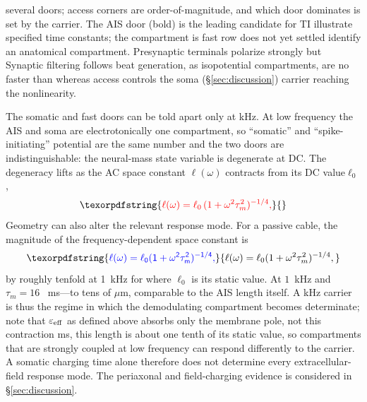 \documentclass[11pt,a4paper]{article}
\providecommand{\DIFaddtex}[1]{{\protect\color{blue} \sf #1}} %
\providecommand{\DIFdeltex}[1]{{\protect\color{red} \scriptsize #1}} %
\providecommand{\DIFaddbegin}{} %
\providecommand{\DIFaddend}{} %
\providecommand{\DIFdelbegin}{} %
\providecommand{\DIFdelend}{} %
\providecommand{\DIFaddFL}[1]{\DIFadd{#1}} %
\providecommand{\DIFdelFL}[1]{\DIFdel{#1}} %
\providecommand{\DIFaddbeginFL}{} %
\providecommand{\DIFaddendFL}{} %
\providecommand{\DIFdelbeginFL}{} %
\providecommand{\DIFdelendFL}{} %
\providecommand{\DIFadd}[1]{\texorpdfstring{\DIFaddtex{#1}}{#1}} %
\providecommand{\DIFdel}[1]{\texorpdfstring{\DIFdeltex{#1}}{}} %
\begin{document}
\begin{table}[h]
{{several doors; }\DIFdelendFL \DIFaddbeginFL \DIFaddFL{access }\DIFaddendFL corners \DIFdelbeginFL \DIFdelFL{are order-of-magnitude, and which door dominates is set by the carrier. The AIS
door (bold) is the leading candidate for TI}\DIFdelendFL \DIFaddbeginFL \DIFaddFL{illustrate specified time
constants}\DIFaddendFL ; the \DIFdelbeginFL \DIFdelFL{compartment is }\DIFdelendFL \DIFaddbeginFL \DIFaddFL{fast row does }\DIFaddendFL not \DIFdelbeginFL \DIFdelFL{yet settled}\DIFdelendFL \DIFaddbeginFL \DIFaddFL{identify an anatomical compartment}\DIFaddendFL . \DIFdelbeginFL \DIFdelFL{Presynaptic
terminals polarize strongly but}\DIFdelendFL \DIFaddbeginFL \DIFaddFL{Synaptic
filtering follows beat generation}\DIFaddendFL , \DIFdelbeginFL \DIFdelFL{as isopotential compartments, are no faster than }\DIFdelendFL \DIFaddbeginFL \DIFaddFL{whereas access controls }\DIFaddendFL the \DIFdelbeginFL \DIFdelFL{soma
(\S\ref{sec:discussion})}\DIFdelendFL \DIFaddbeginFL \DIFaddFL{carrier reaching
the nonlinearity}\DIFaddendFL .}
\label{tab:doors}
\end{table}

\DIFdelbegin \DIFdel{The somatic and fast doors can be told apart only at kHz. At low frequency the AIS and soma are electrotonically one compartment, so ``somatic'' and ``spike-initiating'' potential are
the
same number and the two doors are indistinguishable: the neural-mass state variable is degenerate at
DC. The degeneracy lifts as the AC space constant $\ell(\omega)$ contracts from its DC value$\ell_0$,
}\begin{displaymath}
\DIFdel{\ell(\omega)=\ell_0\,(1+\omega^2\tau_m^2)^{-1/4},
}\end{displaymath}%
\DIFdelend \DIFaddbegin \DIFadd{Geometry can also alter the relevant response mode. For a passive cable, the
magnitude of the frequency-dependent space constant is
}\begin{equation}
\DIFadd{\ell(\omega)=\ell_0(1+\omega^2\tau_m^2)^{-1/4},
\label{eq:lambda}
}\end{equation}\DIFaddend
\DIFdelbegin \DIFdel{by roughly tenfold at 1~kHz for }\DIFdelend \DIFaddbegin \DIFadd{where $\ell_0$ is its static value. At $1$~kHz and }\DIFaddend $\tau_m=16$~\DIFdelbegin \DIFdel{ms---to tens of $\mu$m, comparable to the AIS length itself. A kHz carrier is thus the regime in which the demodulating compartment becomes determinate; note that
$\varepsilon_{\rm eff}$ as defined above absorbs only the membrane pole, not this contraction}\DIFdelend \DIFaddbegin \DIFadd{ms, this length
is about one tenth of its static value, so compartments that are strongly coupled
at low frequency can respond differently to the carrier. A somatic charging time
alone therefore does not determine every extracellular-field response mode.
The periaxonal and field-charging evidence is considered in \S\ref{sec:discussion}}\DIFaddend .
\end{document}
